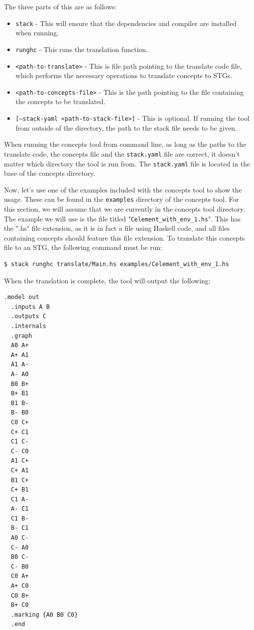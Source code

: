 \documentclass{proc}
\begin{document}
The three parts of this are as follows:
\begin{itemize}
  \item \texttt{stack} - This will ensure that the dependencies and compiler are installed when running.
  \item \texttt{runghc} - This runs the translation function.
  \item \texttt{<path-to-translate>} - This is file path pointing to the translate code file, which performs the necessary operations to translate concepts to STGs.
  \item \texttt{<path-to-concepts-file>} - This is the path pointing to the file containing the concepts to be translated.
  \item \texttt{[--stack-yaml <path-to-stack-file>]} - This is optional. If running the tool from outside of the directory, the path to the stack file needs to be given.
\end{itemize}

When running the concepts tool from command line, as long as the paths to the translate code, the concepts
file and the \texttt{stack.yaml} file are correct, it doesn't matter which directory the tool is run from.  The \texttt{stack.yaml} file is located in the base of the concepts directory.

Now, let's use one of the examples included with the concepts tool to show the usage. These can be found in the \texttt{examples} directory of the concepts tool. 
For this section, we will assume that we are currently in the concepts tool directory. The example we will use is the file titled "\texttt{Celement\_with\_env\_1.hs}". 
This has the ".hs" file extension, as it is in fact a file using Haskell code, and all files containing concepts should feature this file extension. 
To translate this concepts file to an STG, the following command must be run:

\begin{lstlisting}[language=bash]
  $ stack runghc translate/Main.hs examples/Celement_with_env_1.hs
\end{lstlisting}

When the translation is complete, the tool will output the following:

\begin{lstlisting}[language=bash]
  .model out
  .inputs A B
  .outputs C
  .internals
  .graph
  A0 A+
  A+ A1
  A1 A-
  A- A0
  B0 B+
  B+ B1
  B1 B-
  B- B0
  C0 C+
  C+ C1
  C1 C-
  C- C0
  A1 C+
  C+ A1
  B1 C+
  C+ B1
  C1 A-
  A- C1
  C1 B-
  B- C1
  A0 C-
  C- A0
  B0 C-
  C- B0
  C0 A+
  A+ C0
  C0 B+
  B+ C0
  .marking {A0 B0 C0}
  .end
\end{lstlisting}
\end{document}
